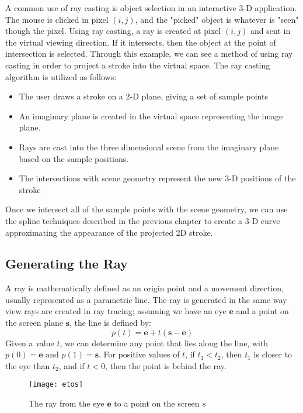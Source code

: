 A common use of ray casting is object selection in an interactive 3-D application.
The mouse is clicked in pixel $(i,j)$, and the "picked" object is whatever is "seen" though the pixel.
Using ray casting, a ray is created at pixel $(i,j)$ and sent in the virtual viewing direction.
If it intersects, then the object at the point of intersection is selected.
Through this example, we can see a method of using ray casting in order to project a stroke into the virtual space.
The ray casting algorithm is utilized as follows:
\begin{itemize}
\item The user draws a stroke on a 2-D plane, giving a set of sample points
\item An imaginary plane is created in the virtual space representing the image plane.
\item Rays are cast into the three dimensional scene from the imaginary plane based on the sample positions.
\item The intersections with scene geometry represent the new 3-D positions of the stroke
\end{itemize}
Once we intersect all of the sample points with the scene geometry, we can use the spline techniques described in the previous chapter to create a 3-D curve approximating the appearance of the projected 2D stroke.

\subsection{Generating the Ray}

A ray is mathematically defined as an origin point and a movement direction, usually represented as a parametric line.
The ray is generated in the same way view rays are created in ray tracing; assuming we have an eye $\mathbf{e}$ and a point on the screen plane $\mathbf{s}$, the line is defined by:
\begin{equation}
p(t) = \mathbf{e} + t(\mathbf{s} - \mathbf{e})
\end{equation}
Given a value $t$, we can determine any point that lies along the line, with $p(0) = \mathbf{e} \text{ and } p(1) = \mathbf{s}$.
For positive values of $t$, if $t_1 < t_2$, then $t_1$ is closer to the eye than $t_2$, and if $t < 0$, then the point is behind the ray.
\begin{figure}
\texttt{[image: etos]}
\caption{The ray from the eye $\mathbf{e}$ to a point on the screen $s$}
\end{figure}

